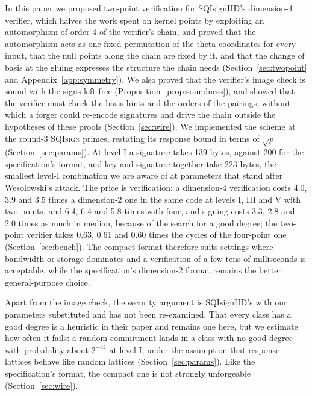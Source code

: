 \documentclass[version=preprint]{iacrcc}
\newcommand{\SQIsign}{SQI{\textsc{sign}}}
\begin{document}
    In this paper we proposed two-point verification for SQIsignHD's
    dimension-4 verifier, which halves the work spent on kernel points by
    exploiting an automorphism of order 4 of the verifier's chain, and proved
    that the automorphism acts as one fixed permutation of the theta
    coordinates for every input, that the null points along the chain are
    fixed by it, and that the change of basis at the gluing expresses the
    structure the chain needs (Section~\ref{sec:twopoint} and
    Appendix~\ref{app:symmetry}). We also proved that the verifier's image
    check is sound with the signs left free (Proposition~\ref{prop:soundness}),
    and showed that the verifier must check the basis hints and the orders of
    the pairings, without which a forger could re-encode signatures and drive
    the chain outside the hypotheses of these proofs (Section~\ref{sec:wire}).
    We implemented the scheme at the round-3
    {\SQIsign} primes, restating its response bound in terms of $\sqrt{p}$
    (Section~\ref{sec:params}). At level I a signature takes 139 bytes, against 200 for the
    specification's format, and key and signature together take 223 bytes, the
    smallest level-I
    combination we are aware of at parameters that stand after
    Wesolowski's attack. The price is verification: a dimension-4
    verification costs 4.0, 3.9 and 3.5 times a dimension-2 one in
    the same code at levels I, III and V with two points, and 6.4, 6.4 and
    5.8 times with four, and
    signing costs 3.3, 2.8 and 2.0 times as much in median, because of the search
    for a good degree;
    the two-point verifier takes 0.63, 0.61 and 0.60 times the cycles of
    the four-point one (Section~\ref{sec:bench}). The compact format therefore suits settings
    where bandwidth or storage dominates and a verification of a few tens of
    milliseconds is acceptable, while the specification's dimension-2 format
    remains the better general-purpose choice.

    Apart from the image check, the security argument is SQIsignHD's with our
    parameters substituted and has not been re-examined. That every class
    has a good degree is a heuristic in their paper and remains one here, but
    we estimate how often it fails: a random commitment lands in a class with
    no good degree with probability about $2^{-44}$ at level I, under the
    assumption that response lattices behave like random lattices
    (Section~\ref{sec:params}). Like the specification's
    format, the compact one is not strongly unforgeable
    (Section~\ref{sec:wire}).
\end{document}
